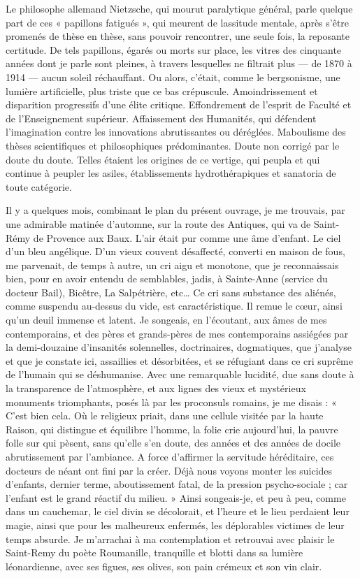\documentclass[french,twoside]{book} %
\begin{document}
Le philosophe allemand Nietzsche, qui mourut paralytique général, parle quelque part de ces « papillons fatigués », qui meurent de lassitude mentale, après s’être promenés de thèse en thèse, sans pouvoir rencontrer, une seule fois, la reposante certitude. De tels papillons, égarés ou morts sur place, les vitres des cinquante années dont je parle sont pleines, à travers lesquelles ne filtrait plus — de 1870 à 1914 — aucun soleil réchauffant. Ou alors, c’était, comme le bergsonisme, une lumière artificielle, plus triste que ce bas crépuscule. Amoindrissement et disparition progressifs d’une élite critique. Effondrement de l’esprit de Faculté et de l’Enseignement supérieur. Affaissement des Humanités, qui défendent l’imagination contre les innovations abrutissantes ou déréglées. Maboulisme des thèses scientifiques et philosophiques prédominantes. Doute non corrigé par le doute du doute. Telles étaient les origines de ce vertige, qui peupla et qui continue à peupler les asiles, établissements hydrothérapiques et sanatoria de toute catégorie.\par
Il y a quelques mois, combinant le plan du présent ouvrage, je me trouvais, par une admirable matinée d’automne, sur la route des Antiques, qui va de Saint-Rémy de Provence aux Baux. L’air était pur comme une âme d’enfant. Le ciel d’un bleu angélique. D’un vieux couvent désaffecté, converti en maison de fous, me parvenait, de temps à autre, un cri aigu et monotone, que je reconnaissais bien, pour en avoir entendu de semblables, jadis, à Sainte-Anne (service du docteur Bail), Bicêtre, La Salpétrière, etc… Ce cri sans substance des aliénés, comme suspendu au-dessus du vide, est caractéristique. Il remue le cœur, ainsi qu’un deuil immense et latent. Je songeais, en l’écoutant, aux âmes de mes contemporains, et des pères et grands-pères de mes contemporains assiégées par la demi-douzaine d’insanités solennelles, doctrinaires, dogmatiques, que j’analyse et que je constate ici, assaillies et désorbitées, et se réfugiant dans ce cri suprême de l’humain qui se déshumanise. Avec une remarquable lucidité, due sans doute à la transparence de l’atmosphère, et aux lignes des vieux et mystérieux monuments triomphants, posés là par les proconsuls romains, je me disais : « C’est bien cela. Où le religieux priait, dans une cellule visitée par la haute Raison, qui distingue et équilibre l’homme, la folie crie aujourd’hui, la pauvre folle sur qui pèsent, sans qu’elle s’en doute, des années et des années de docile abrutissement par l’ambiance. A force d’affirmer la servitude héréditaire, ces docteurs de néant ont fini par la créer. Déjà nous voyons monter les suicides d’enfants, dernier terme, aboutissement fatal, de la pression psycho-sociale ; car l’enfant est le grand réactif du milieu. » Ainsi songeais-je, et peu à peu, comme dans un cauchemar, le ciel divin se décolorait, et l’heure et le lieu perdaient leur magie, ainsi que pour les malheureux enfermés, les déplorables victimes de leur temps absurde. Je m’arrachai à ma contemplation et retrouvai avec plaisir le Saint-Remy du poète Roumanille, tranquille et blotti dans sa lumière léonardienne, avec ses figues, ses olives, son pain crémeux et son vin clair.\par
\end{document}
